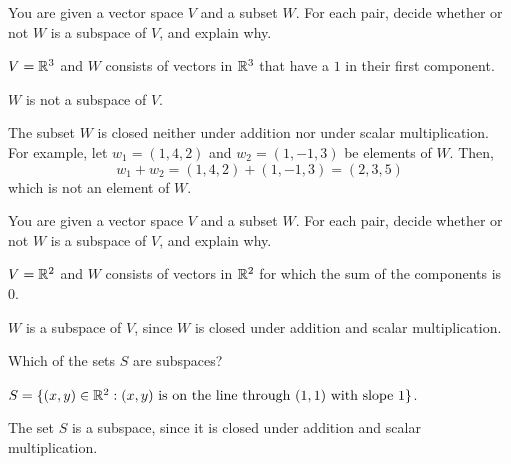 \documentclass{article}
\begin{document}




\problemlabel

\noindent You are given a vector space $V$ and a subset $W$.  For each pair, decide whether or not $W$ is a subspace of $V$, and explain why.

\begin{exercise} \label{c5.1.4b}
$V=\mathbb R^3$ and $W$ consists of vectors in $\mathbb R^3$
     that have a $1$ in their first component.

\begin{solution}
\ans $W$ is not a subspace of $V$.

\soln The subset $W$ is closed neither under addition nor under scalar
multiplication.  For example, let $w_1 = (1,4,2)$ and $w_2 = (1,-1,3)$
be elements of $W$.  Then,
\[
w_1 + w_2 = (1,4,2) + (1,-1,3) = (2,3,5)
\]
which is not an element of $W$.


\end{solution}
\end{exercise}





\problemlabel

\noindent You are given a vector space $V$ and a subset $W$.  For each pair, decide whether or not $W$ is a subspace of $V$, and explain why.

\begin{exercise} \label{c5.1.4c}
$V=\mathbb R^2$ and $W$ consists of vectors in $\mathbb R^2$
     for which the sum of the components is $0$.

\begin{solution}
$W$ is a subspace of $V$, since $W$ is closed under
addition and scalar multiplication.

\end{solution}
\end{exercise}





\problemlabel

\noindent Which of the sets $S$ are subspaces?

\begin{exercise} \label{c5.1.5c}
$S = \{(x,y)\in\mathbb R^2: (x,y) \mbox{ is on the line through }
(1,1) \mbox{ with slope } 1\}$.

\begin{solution}
The set $S$ is a subspace, since it is closed under
addition and scalar multiplication.

\end{solution}
\end{exercise}
\end{document}
